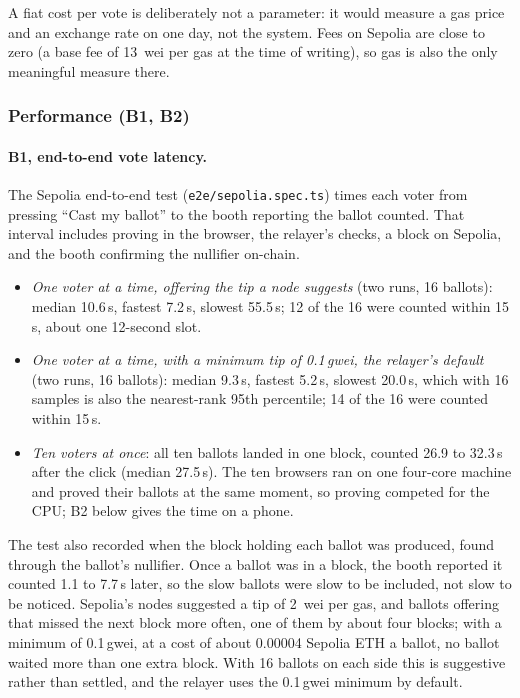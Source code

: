 A fiat cost per vote is deliberately not a parameter: it would measure a gas
price and an exchange rate on one day, not the system. Fees on Sepolia are
close to zero (a base fee of 13~wei per gas at the time of writing), so gas is
also the only meaningful measure there.

\subsubsection{Performance (B1, B2)}

\paragraph{B1, end-to-end vote latency.}
The Sepolia end-to-end test (\texttt{e2e/sepolia.spec.ts}) times each voter
from pressing ``Cast my ballot'' to the booth reporting the ballot counted.
That interval includes proving in the browser, the relayer's checks, a block
on Sepolia, and the booth confirming the nullifier on-chain.

\begin{itemize}
  \item \emph{One voter at a time, offering the tip a node suggests} (two
        runs, 16 ballots): median 10.6\,s, fastest
        7.2\,s, slowest 55.5\,s; 12 of the 16 were counted within 15\,s,
        about one 12-second slot.
  \item \emph{One voter at a time, with a minimum tip of 0.1\,gwei, the
        relayer's default} (two runs, 16 ballots): median 9.3\,s, fastest 5.2\,s,
        slowest 20.0\,s, which with 16 samples is also the nearest-rank 95th
        percentile; 14 of the 16 were counted within 15\,s.
  \item \emph{Ten voters at once}: all ten ballots
        landed in one block, counted 26.9 to 32.3\,s after the click (median
        27.5\,s). The ten browsers ran on one four-core machine and proved
        their ballots at the same moment, so proving competed for the CPU;
        B2 below gives the time on a phone.
\end{itemize}

The test also recorded when the block holding each ballot was produced, found
through the ballot's nullifier. Once a ballot was in
a block, the booth reported it counted 1.1 to 7.7\,s later, so the slow ballots
were slow to be included, not slow to be noticed. Sepolia's nodes suggested a
tip of 2~wei per gas, and ballots offering that missed the next block more
often, one of them by about four blocks; with a minimum of 0.1\,gwei, at a cost of about 0.00004 Sepolia
ETH a ballot, no ballot waited more than one extra block. With 16 ballots on
each side this is suggestive rather than settled, and the relayer uses the
0.1\,gwei minimum by default.

